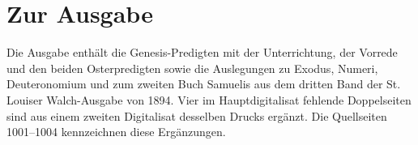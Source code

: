 \documentclass{oll-book}
\begin{document}
\frontmatter

\chapter{Zur Ausgabe}
Die Ausgabe enthält die Genesis-Predigten mit der Unterrichtung,
der Vorrede und den beiden Osterpredigten sowie die Auslegungen zu Exodus,
Numeri, Deuteronomium und zum zweiten Buch Samuelis aus dem dritten Band
der St. Louiser Walch-Ausgabe von 1894. Vier im Hauptdigitalisat fehlende Doppelseiten sind aus einem
zweiten Digitalisat desselben Drucks ergänzt. Die Quellseiten 1001–1004
kennzeichnen diese Ergänzungen.
\tableofcontents
\mainmatter

\end{document}
